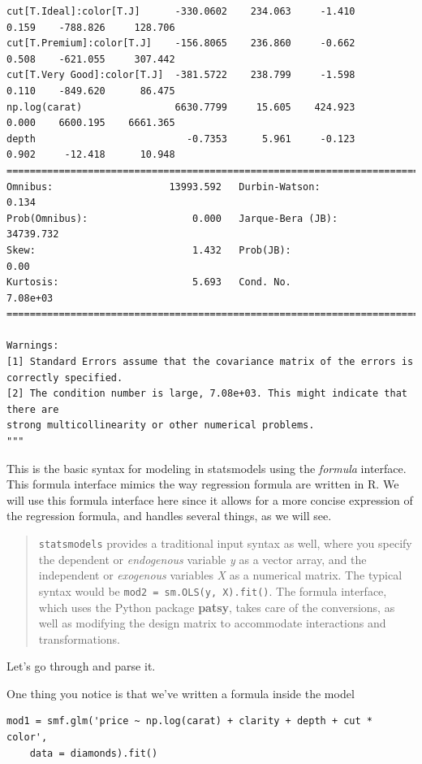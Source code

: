 \documentclass[
  letterpaper,
]{scrbook}
\begin{document}
\begin{verbatim}
cut[T.Ideal]:color[T.J]      -330.0602    234.063     -1.410      0.159    -788.826     128.706
cut[T.Premium]:color[T.J]    -156.8065    236.860     -0.662      0.508    -621.055     307.442
cut[T.Very Good]:color[T.J]  -381.5722    238.799     -1.598      0.110    -849.620      86.475
np.log(carat)                6630.7799     15.605    424.923      0.000    6600.195    6661.365
depth                          -0.7353      5.961     -0.123      0.902     -12.418      10.948
==============================================================================
Omnibus:                    13993.592   Durbin-Watson:                   0.134
Prob(Omnibus):                  0.000   Jarque-Bera (JB):            34739.732
Skew:                           1.432   Prob(JB):                         0.00
Kurtosis:                       5.693   Cond. No.                     7.08e+03
==============================================================================

Warnings:
[1] Standard Errors assume that the covariance matrix of the errors is correctly specified.
[2] The condition number is large, 7.08e+03. This might indicate that there are
strong multicollinearity or other numerical problems.
"""
\end{verbatim}

This is the basic syntax for modeling in statsmodels using the \emph{formula} interface. This formula interface mimics the way regression formula are written in R. We will use this formula interface here since it allows for a more concise expression of the regression formula, and handles several things, as we will see.

\begin{quote}
\texttt{statsmodels} provides a traditional input syntax as well, where you
specify the dependent or \emph{endogenous} variable \emph{y} as a vector array, and the
independent or \emph{exogenous} variables \emph{X} as a numerical matrix. The typical syntax would be \texttt{mod2\ =\ sm.OLS(y,\ X).fit()}. The formula interface,
which uses the Python package \textbf{patsy}, takes care of the conversions, as
well as modifying the design matrix to accommodate interactions and
transformations.
\end{quote}

Let's go through and parse it.

One thing you notice is that we've written a formula inside the model

\begin{verbatim}
mod1 = smf.glm('price ~ np.log(carat) + clarity + depth + cut * color', 
    data = diamonds).fit()
\end{verbatim}
\end{document}
